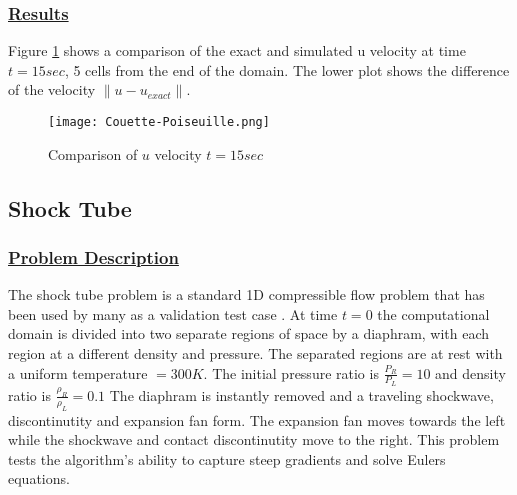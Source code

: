 \subsubsection*{\underline{Results}}
Figure \ref{fig:CombinedPoiseuille} shows a comparison of the exact and simulated u
velocity at time $t = 15sec$, 5 cells from the end of the domain.  The lower
plot shows the difference of the velocity $\|u - u_{exact}\|$.
%
\begin{figure}
  \texttt{[image: Couette-Poiseuille.png]}
  \vspace{-20pt}
  \caption{ Comparison of $u$ velocity $t = 15sec$}
  \label{fig:CombinedPoiseuille}
  \end{figure}
\newpage
%
\subsection*{\center Shock Tube}
\subsubsection*{\underline{Problem Description}}
The shock tube problem is a standard 1D compressible flow problem that
has been used by many as a validation test case \cite{ref:laney, ref:sod, ref:toro}.
At time $t=0$ the computational domain is divided into two separate regions of
space by a diaphram, with each region at a different density and pressure.
The separated regions are at rest with a uniform temperature $=300K$.
The initial pressure ratio is $\frac{P_R}{P_L}  = 10$ and density ratio
is $\frac{\rho_R}{\rho_L} = 0.1$  The diaphram is instantly removed and a
traveling shockwave, discontinutity and expansion fan form.  The expansion
fan moves towards the left while the shockwave and contact discontinutity
move to the right.  This problem tests the algorithm's ability to capture
steep gradients and solve Eulers equations.
%
